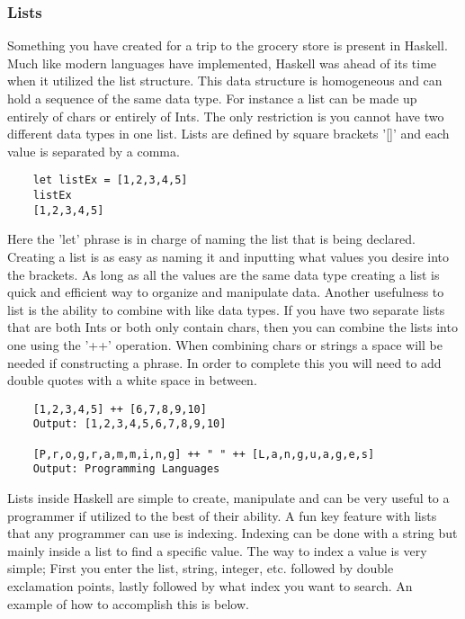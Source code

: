 \documentclass{article}
\begin{document}
    \subsubsection{Lists}
    Something you have created for a trip to the grocery store is present in Haskell. Much like modern languages have implemented, Haskell was ahead of its time when it utilized the list structure. This data structure is homogeneous and can hold a sequence of the same data type. For instance a list can be made up entirely of chars or entirely of Ints. The only restriction is you cannot have two different data types in one list. Lists are defined by square brackets '[]' and each value is separated by a comma. 
    
    \begin{lstlisting}
    let listEx = [1,2,3,4,5]
    listEx
    [1,2,3,4,5]
    \end{lstlisting}
    
    Here the 'let' phrase is in charge of naming the list that is being declared. Creating a list is as easy as naming it and inputting what values you desire into the brackets. As long as all the values are the same data type creating a list is quick and efficient way to organize and manipulate data. Another usefulness to list is the ability to combine with like data types. If you have two separate lists that are both Ints or both only contain chars, then you can combine the lists into one using the '++' operation. When combining chars or strings a space will be needed if constructing a phrase. In order to complete this you will need to add double quotes with a white space in between.
    
    \begin{lstlisting}
    [1,2,3,4,5] ++ [6,7,8,9,10]  
    Output: [1,2,3,4,5,6,7,8,9,10]
    
    [P,r,o,g,r,a,m,m,i,n,g] ++ " " ++ [L,a,n,g,u,a,g,e,s]
    Output: Programming Languages
    \end{lstlisting}
    
    Lists inside Haskell are simple to create, manipulate and can be very useful to a programmer if utilized to the best of their ability. A fun key feature with lists that any programmer can use is indexing. Indexing can be done with a string but mainly inside a list to find a specific value. The way to index a value is very simple; First you enter the list, string, integer, etc. followed by double exclamation points, lastly followed by what index you want to search. An example of how to accomplish this is below. 
    
\end{document}
